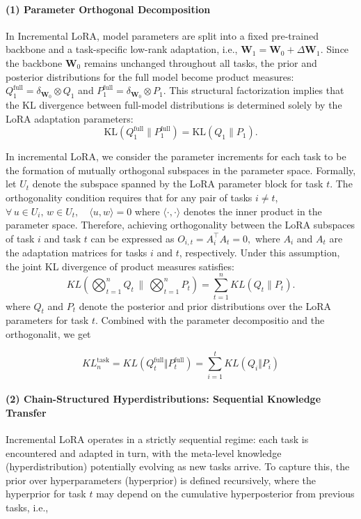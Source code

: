 \documentclass[letterpaper]{article} %
\begin{document}
\paragraph{(1) Parameter Orthogonal Decomposition}

In Incremental LoRA, model parameters are split into a fixed pre-trained backbone and a task-specific low-rank adaptation, i.e., $\boldsymbol{W}_1 = \boldsymbol{W}_0 + \Delta\boldsymbol{W}_1$. Since the backbone $\boldsymbol{W}_0$ remains unchanged throughout all tasks, the prior and posterior distributions for the full model become product measures: $Q_1^{\text{full}} = \delta_{\boldsymbol{W}_0} \otimes Q_1$ and $P_1^{\text{full}} = \delta_{\boldsymbol{W}_0} \otimes P_1$. This structural factorization implies that the KL divergence between full-model distributions is determined solely by the LoRA adaptation parameters:$$ \mathrm{KL}(Q_1^{\text{full}} \| P_1^{\text{full}}) = \mathrm{KL}(Q_1 \| P_1).$$


 In incremental LoRA, we consider the parameter increments for each task to be the formation of mutually orthogonal subspaces in the parameter space. Formally, let $U_t$ denote the subspace spanned by the LoRA parameter block for task $t$. The orthogonality condition requires that for any pair of tasks $i \neq t$,
$ \forall\, u \in U_i,\, w \in U_t, \quad \langle u, w \rangle = 0$
where $\langle \cdot, \cdot \rangle$ denotes the inner product in the parameter space. Therefore, achieving orthogonality between the LoRA subspaces of task $i$ and task $t$ can be expressed as
${O}_{i,t} = A_i^{\top} A_t = 0,$
where $A_i$ and $A_t$ are the adaptation matrices for tasks $i$ and $t$, respectively. Under this assumption, the joint KL divergence of product measures satisfies:   
$$
      KL\left(\bigotimes_{t=1}^n Q_t \, \bigg\| \, \bigotimes_{t=1}^n P_t\right) = \sum_{t=1}^n KL(Q_t \| P_t).
$$
where $Q_t$ and $P_t$ denote the posterior and prior distributions over the LoRA parameters for task $t$. 
Combined with the parameter decompositio and the orthogonalit, we get

\begin{equation}
 {KL}^{\text{task}}_n = {KL}\left(Q_t^{\text{full}} \Vert P_t^{\text{full}}\right) = \sum_{i=1}^t {KL}(Q_i \Vert P_i)
\end{equation}

\paragraph{(2) Chain-Structured Hyperdistributions: Sequential Knowledge Transfer}
Incremental LoRA operates in a strictly sequential regime: each task is encountered and adapted in turn, with the meta-level knowledge (hyperdistribution) potentially evolving as new tasks arrive. To capture this, the prior over hyperparameters (hyperprior) is defined recursively, where the hyperprior for task $t$ may depend on the cumulative hyperposterior from previous tasks, i.e.,
\end{document}
